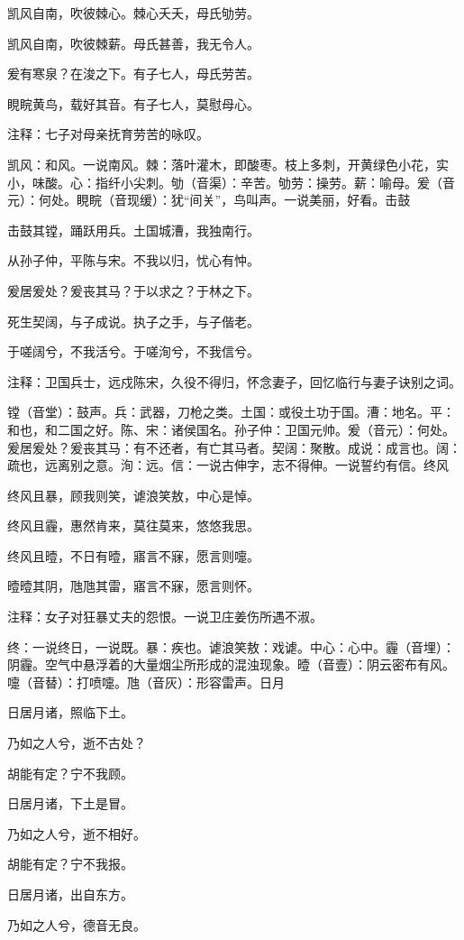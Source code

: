 \documentclass[12pt,UTF8]{ctexbook}
\begin{document}
凯风自南，吹彼棘心。棘心夭夭，母氏劬劳。

凯风自南，吹彼棘薪。母氏甚善，我无令人。

爰有寒泉？在浚之下。有子七人，母氏劳苦。

睍睆黄鸟，载好其音。有子七人，莫慰母心。

注释：七子对母亲抚育劳苦的咏叹。

凯风：和风。一说南风。棘：落叶灌木，即酸枣。枝上多刺，开黄绿色小花，实小，味酸。心：指纤小尖刺。劬（音渠）：辛苦。劬劳：操劳。薪：喻母。爰（音元）：何处。睍睆（音现缓）：犹“间关”，鸟叫声。一说美丽，好看。击鼓

击鼓其镗，踊跃用兵。土国城漕，我独南行。

从孙子仲，平陈与宋。不我以归，忧心有忡。

爰居爰处？爰丧其马？于以求之？于林之下。

死生契阔，与子成说。执子之手，与子偕老。

于嗟阔兮，不我活兮。于嗟洵兮，不我信兮。

注释：卫国兵士，远戍陈宋，久役不得归，怀念妻子，回忆临行与妻子诀别之词。

镗（音堂）：鼓声。兵：武器，刀枪之类。土国：或役土功于国。漕：地名。平：和也，和二国之好。陈、宋：诸侯国名。孙子仲：卫国元帅。爰（音元）：何处。爰居爰处？爰丧其马：有不还者，有亡其马者。契阔：聚散。成说：成言也。阔：疏也，远离别之意。洵：远。信：一说古伸字，志不得伸。一说誓约有信。终风

终风且暴，顾我则笑，谑浪笑敖，中心是悼。

终风且霾，惠然肯来，莫往莫来，悠悠我思。

终风且曀，不日有曀，寤言不寐，愿言则嚏。

曀曀其阴，虺虺其雷，寤言不寐，愿言则怀。

注释：女子对狂暴丈夫的怨恨。一说卫庄姜伤所遇不淑。

终：一说终日，一说既。暴：疾也。谑浪笑敖：戏谑。中心：心中。霾（音埋）：阴霾。空气中悬浮着的大量烟尘所形成的混浊现象。曀（音壹）：阴云密布有风。嚏（音替）：打喷嚏。虺（音灰）：形容雷声。日月

日居月诸，照临下土。

乃如之人兮，逝不古处？

胡能有定？宁不我顾。

日居月诸，下土是冒。

乃如之人兮，逝不相好。

胡能有定？宁不我报。

日居月诸，出自东方。

乃如之人兮，德音无良。
\end{document}
